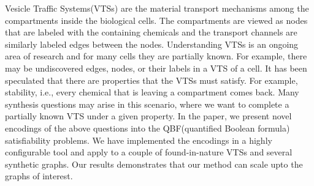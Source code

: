 Vesicle Traffic Systems(VTSs) are the material transport mechanisms
among the compartments inside the biological cells.
%
The compartments are viewed as nodes that are labeled with the
containing chemicals and the transport channels are similarly labeled
edges between the nodes.
%
Understanding VTSs is an ongoing area of research and for many cells
they are partially known.
%
For example, there may be undiscovered edges, nodes, or their labels
in a VTS of a cell.
%
It has been speculated that there are properties that the VTSs must
satisfy.
%
For example, stability, i.e., every chemical that is leaving a
compartment comes back.
%
Many synthesis questions may arise in this scenario, where we want
to complete a partially known VTS under a given property.
%
In the paper, we present novel encodings of the above questions
into the QBF(quantified Boolean formula) satisfiability problems.
%
We have implemented the encodings in a highly configurable tool
and  apply to a couple of found-in-nature VTSs and 
several synthetic graphs.
%
Our results demonstrates that our method can scale upto the
graphs of interest.
%


